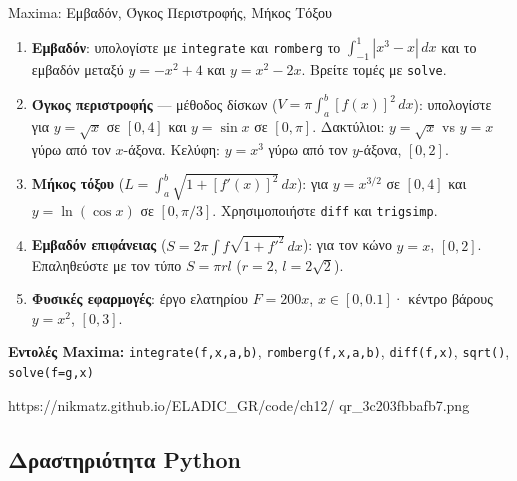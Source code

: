 %

\casactivbox%
  {Maxima: Εμβαδόν, Όγκος Περιστροφής, Μήκος Τόξου}%
  {%
    \label{cas:ch12_integral_apps}
    \begin{enumerate}[label=(\alph*),itemsep=2pt]
      \item \textbf{Εμβαδόν}: υπολογίστε με \texttt{integrate} και
        \texttt{romberg} το $\int_{-1}^{1}|x^3-x|\,dx$ και το
        εμβαδόν μεταξύ $y=-x^2+4$ και $y=x^2-2x$.
        Βρείτε τομές με \texttt{solve}.
      \item \textbf{Όγκος περιστροφής} — μέθοδος δίσκων
        ($V=\pi\int_a^b[f(x)]^2\,dx$): υπολογίστε για
        $y=\sqrt{x}$ σε $[0,4]$ και $y=\sin x$ σε $[0,\pi]$.
        Δακτύλιοι: $y=\sqrt{x}$ vs $y=x$ γύρω από τον $x$-άξονα.
        Κελύφη: $y=x^3$ γύρω από τον $y$-άξονα, $[0,2]$.
      \item \textbf{Μήκος τόξου} ($L=\int_a^b\!\sqrt{1+[f'(x)]^2}\,dx$):
        για $y=x^{3/2}$ σε $[0,4]$ και $y=\ln(\cos x)$ σε $[0,\pi/3]$.
        Χρησιμοποιήστε \texttt{diff} και \texttt{trigsimp}.
      \item \textbf{Εμβαδόν επιφάνειας} ($S=2\pi\!\int f\sqrt{1+f'^2}\,dx$):
        για τον κώνο $y=x$, $[0,2]$. Επαληθεύστε με τον τύπο
        $S=\pi r l$ ($r=2$, $l=2\sqrt{2}$).
      \item \textbf{Φυσικές εφαρμογές}: έργο ελατηρίου $F=200x$,
        $x\in[0,0.1]$· κέντρο βάρους $y=x^2$, $[0,3]$.
    \end{enumerate}
    \smallskip
    \textbf{Εντολές Maxima:}
    \texttt{integrate(f,x,a,b)}, \texttt{romberg(f,x,a,b)},
    \texttt{diff(f,x)}, \texttt{sqrt()}, \texttt{solve(f=g,x)}
  }%
  {https://nikmatz.github.io/ELADIC_GR/code/ch12/}%
  {qr_3c203fbbafb7.png}

\subsection*{Δραστηριότητα Python}

